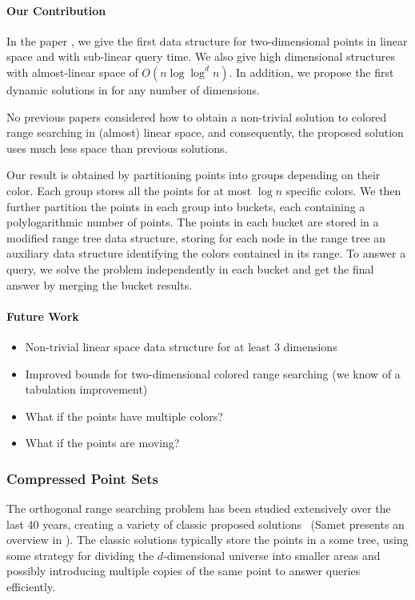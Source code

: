 \paragraph{Our Contribution} 
In the paper , we give the first data structure for two-dimensional points in linear space and with sub-linear query time. We also give high dimensional structures with almost-linear space of $O(n \log \log^d n)$. In addition, we propose the first dynamic solutions in for any number of dimensions.

No previous papers considered how to obtain a non-trivial solution to colored range searching in (almost) linear space, and consequently, the proposed solution uses much less space than previous solutions.

Our result is obtained by partitioning points into groups depending on their color. Each group stores all the points for at most $\log n$ specific colors. We then further partition the points in each group into buckets, each containing a polylogarithmic number of points. 
The points in each bucket are stored in a modified range tree data structure, storing for each node in the range tree an auxiliary data structure identifying the colors contained in its range. 
To answer a query, we solve the problem independently in each bucket and get the final answer by merging the bucket results. 


\paragraph{Future Work}
\begin{itemize}
    \item Non-trivial linear space data structure for at least 3 dimensions
    \item Improved bounds for two-dimensional colored range searching (we know of a tabulation improvement)
    \item What if the points have multiple colors?
    \item What if the points are moving?
\end{itemize}


\clearpage
\subsubsection{Compressed Point Sets}
The orthogonal range searching problem has been studied extensively over the last 40 years, creating a variety of classic proposed solutions~\cite{bentley1975multidimensional, bentley1979multidimensional, orenstein1982multidimensional, bentley1980decomposable, lueker1978data, lee1980quintary, guttman1984r, clarkson1983fast, kanth1999optimal, van1991dividedk, gaede1998multidimensional, bayer1972organization, arge2008priority, robinson1981kdb, procopiuc2003bkd, comer1979ubiquitous, eppstein2008skip} (Samet presents an overview in \cite{samet1990applications}). The classic solutions typically store the points in a some tree, using some strategy for dividing the $d$-dimensional universe into smaller areas and possibly introducing multiple copies of the same point to answer queries efficiently. 

